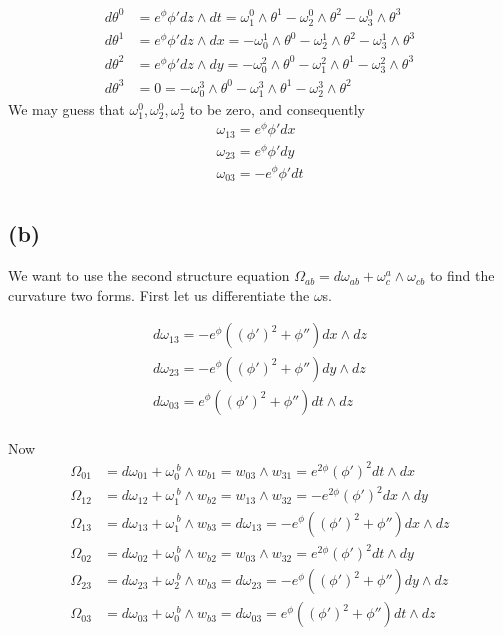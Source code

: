 \documentclass{article}
\theoremstyle{definition}
\theoremstyle{definition}
\theoremstyle{remark}
\begin{document}
\begin{align*}
	d\theta^0 &= e^{\phi} \phi' dz \wedge dt = \omega^0_1 \wedge \theta^1 - \omega^0_2 \wedge \theta^2 - \omega^0_3 \wedge \theta^3 \\
	d\theta^1 &= e^{\phi} \phi' dz \wedge dx = -\omega^1_0 \wedge \theta^0 -  \omega^1_2 \wedge \theta^2 - \omega^1_3 \wedge \theta^3 \\ 
	d\theta^2 &= e^{\phi} \phi' dz \wedge dy = -\omega^2_0 \wedge \theta^0 - \omega^2_1 \wedge \theta^1  - \omega^2_3 \wedge \theta^3 \\ 
	d\theta^3 &= 0 = -\omega^3_0 \wedge \theta^0 - \omega^3_1 \wedge \theta^1 - \omega^3_2 \wedge \theta^2 
\end{align*}
We may guess that $\omega^0_1, \omega^0_2, \omega^1_2$ to be zero, and consequently
\begin{align*}
	\omega_{13} = e^{\phi} \phi' dx\\ 
	\omega_{23} = e^{\phi} \phi' dy\\
	\omega_{03} = - e^{\phi} \phi' dt\\
\end{align*}

\subsection*{(b)}
We want to use the second structure equation $\Omega_{ab} = d \omega_{ab} + \omega^a_c \wedge \omega_{cb}$ to find the curvature two forms. 
First let us differentiate the $\omega$s.

\begin{align*}
	d\omega_{13} = - e^{\phi}((\phi')^2 + \phi'')dx \wedge dz\\
	d\omega_{23} = - e^{\phi}((\phi')^2 + \phi'')dy \wedge dz\\
	d\omega_{03} = e^{\phi}((\phi')^2 + \phi'')dt \wedge dz\\
\end{align*}

Now 
\begin{align*}
	\Omega_{01} &= d\omega_{01} + \omega^{~b}_{0} \wedge w_{b1} = w_{03} \wedge w_{31} = e^{2\phi} (\phi')^2 dt \wedge dx \\
	\Omega_{12} &= d\omega_{12} + \omega^{~b}_1 \wedge w_{b2} = w_{13} \wedge w_{32} = - e^{2\phi} (\phi')^2 dx \wedge dy \\
	\Omega_{13} &= d\omega_{13} + \omega^{~b}_{1} \wedge w_{b3} = d\omega_{13} =  - e^{\phi}((\phi')^2 + \phi'')dx \wedge dz \\
	\Omega_{02} &= d\omega_{02} + \omega^{~b}_{0} \wedge w_{b2} = w_{03} \wedge w_{32} = e^{2\phi} (\phi')^2 dt \wedge dy \\
	\Omega_{23} &= d\omega_{23} + \omega^{~b}_{2} \wedge w_{b3} = d\omega_{23} =  - e^{\phi}((\phi')^2 + \phi'')dy \wedge dz \\
	\Omega_{03} &= d\omega_{03} + \omega^{~b}_{0} \wedge w_{b3} = d\omega_{03} =  e^{\phi}((\phi')^2 + \phi'')dt \wedge dz \\
\end{align*}
\end{document}
